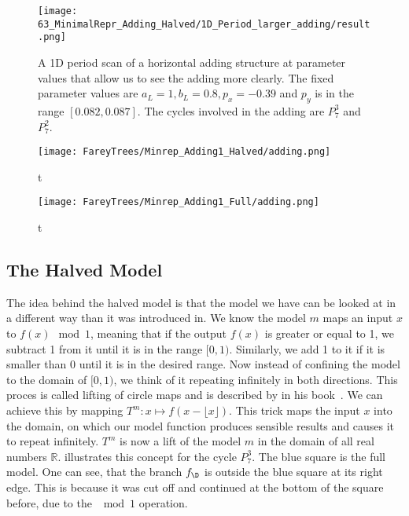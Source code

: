 \begin{figure}
	\centering
	\texttt{[image: 63\_MinimalRepr\_Adding\_Halved/1D\_Period\_larger\_adding/result.png]}
	\caption{
		A 1D period scan of a horizontal adding structure at parameter values that allow us to see the adding more clearly.
		The fixed parameter values are $a_L = 1, b_L = 0.8, p_x = -0.39$ and $p_y$ is in the range $[0.082, 0.087]$.
		The cycles involved in the adding are $P_7^3$ and $P_7^2$.
	}
	\label{fig:minrep.adding1.large.adding}
\end{figure}

\begin{figure}
	\centering
	\texttt{[image: FareyTrees/Minrep\_Adding1\_Halved/adding.png]}
	\caption{t}
	\label{fig:tree.adding1.hor.halved}
\end{figure}

\begin{figure}
	\centering
	\texttt{[image: FareyTrees/Minrep\_Adding1\_Full/adding.png]}
	\caption{t}
	\label{fig:tree.adding1.hor.full}
\end{figure}

\subsection{The Halved Model}

The idea behind the halved model is that the model we have can be looked at in a different way than it was introduced in.
We know the model $m$ maps an input $x$ to $f(x) \mod 1$, meaning that if the output $f(x)$ is greater or equal to 1, we subtract 1 from it until it is in the range $[0, 1)$.
Similarly, we add 1 to it if it is smaller than 0 until it is in the desired range.
Now instead of confining the model to the domain of $[0, 1)$, we think of it repeating infinitely in both directions.
This proces is called lifting of circle maps and is described by  in his book~\cite{devaney2021introduction}.
We can achieve this by mapping $T^m: x \mapsto f(x - \lfloor x \rfloor)$.
This trick maps the input $x$ into the domain, on which our model function produces sensible results and causes it to repeat infinitely.
$T^m$ is now a lift of the model $m$ in the domain of all real numbers $\mathbb{R}$.
 illustrates this concept for the cycle $P_7^3$.
The blue square is the full model.
One can see, that the branch $f_\D$ is outside the blue square at its right edge.
This is because it was cut off and continued at the bottom of the square before, due to the $\mod 1$ operation.

